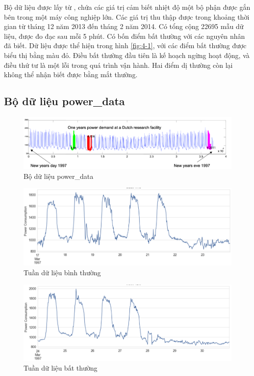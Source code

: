 Bộ dữ liệu được lấy từ \cite{st25}, chứa các giá trị cảm biết nhiệt độ một bộ phận được gắn bên trong một máy công nghiệp lớn. Các giá trị thu thập được trong khoảng thời gian từ tháng 12 năm 2013 đến tháng 2 năm 2014. Có tổng cộng 22695 mẫu dữ liệu, được đo đạc sau mỗi 5 phút. Có bốn điểm bất thường với các nguyên nhân đã biết. Dữ liệu được thể hiện trong hình \ref{fig:4-1}, với các điểm bất thường được biểu thị bằng màu đỏ. Điều bất thường đầu tiên là kế hoạch ngừng hoạt động, và điều thứ tư là một lỗi trong quá trình vận hành. Hai điểm dị thường còn lại không thể nhận biết được bằng mắt thường.

\subsection{Bộ dữ liệu power\_data}
\begin{figure}[H]
    \centering
    \includegraphics[scale=0.75]{./content/images/4-2.png}
    \caption{Bộ dữ liệu power\_data}
    \label{fig:4-2}
\end{figure}

\begin{figure}[H]
    \centering
    \includegraphics[scale=0.75]{./content/images/4-3.png}
    \caption{Tuần dữ liệu bình thường}
    \label{fig:4-3}
\end{figure}

\begin{figure}[H]
    \centering
    \includegraphics[scale=0.75]{./content/images/4-4.png}
    \caption{Tuần dữ liệu bất thường}
    \label{fig:4-4}
\end{figure}

